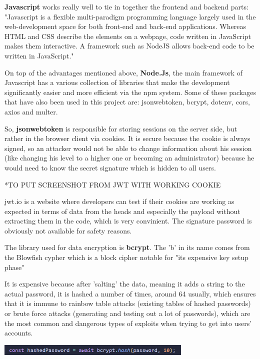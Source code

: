 \documentclass[12pt,a4paper]{report}
\begin{document}
\textbf{Javascript} works really well to tie in together the frontend and backend parts: "Javascript is a flexible multi-paradigm programming language largely used in the web-development space for both front-end and back-end applications. Whereas HTML and CSS describe the elements on a webpage, code written in JavaScript makes them interactive. A framework such as NodeJS allows back-end code to be written in JavaScript."~\cite{JavaScript}

On top of the advantages mentioned above, \textbf{Node.Js}, the main framework of Javascript has a various collection of libraries that make the development significantly easier and more efficient via the npm system. Some of these packages that have also been used in this project are: jsonwebtoken, bcrypt, dotenv, cors, axios and multer.

So, \textbf{jsonwebtoken} is responsible for storing sessions on the server side, but rather in the browser client via cookies. It is secure because the cookie is always signed, so an attacker would not be able to change information about his session (like changing his level to a higher one or becoming an administrator) because he would need to know the secret signature which is hidden to all users.

*TO PUT SCREENSHOT FROM JWT WITH WORKING COOKIE

jwt.io is a website where developers can test if their cookies are working as expected in terms of data from the heads and especially the payload without extracting them in the code, which is very convinient. The signature password is obviously not available for safety reasons.

The library used for data encryption is \textbf{bcrypt}. The 'b' in its name comes from the Blowfish cypher which is a block cipher notable for "its expensive key setup phase"~\cite{blowfishCipher}

It is expensive because after 'salting' the data, meaning it adds a string to the actual password, it is hashed a number of times, around 64 usually, which ensures that it is immune to rainbow table attacks (existing tables of hashed passwords) or brute force attacks (generating and testing out a lot of passwords), which are the most common and dangerous types of exploits when trying to get into users' accounts.

\begin{center}
\includegraphics[width=0.7\textwidth]{images/bcrypt.png}
\end{center}
\end{document}
